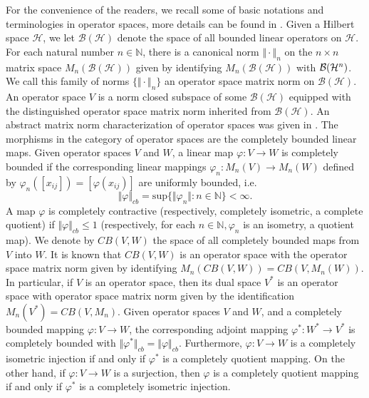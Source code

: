 \documentclass[12pt]{article}
\theoremstyle{definition}
\theoremstyle{remark}
\begin{document}
For the convenience of the readers, we recall
some of basic notations and terminologies in operator spaces, more
details can be found in \cite{ER00, Pi03}. Given a Hilbert space $\mathcal{H}$, we
let $\mathcal{B}(\mathcal{H})$ denote the space of all bounded linear operators on
$\mathcal{H}$. For each natural number $n\in\mathbb{N}$, there is a
canonical norm $\Vert\cdot\Vert_{n}$ on the $n\times n$ matrix space
$M_{n}(\mathcal{B}(\mathcal{H}))$ given by identifying $M_{n}(\mathcal{B}(\mathcal{H}))$ with ${\cal
B}({\cal H}^{n})$. We call this family of norms
$\{\Vert \cdot\Vert_{n}\}$ an operator space matrix norm on $\mathcal{B}(\mathcal{H})$. An
operator space $V$ is a norm closed subspace of some $\mathcal{B}(\mathcal{H})$
equipped with the distinguished operator space matrix norm
inherited from $\mathcal{B}(\mathcal{H})$. An abstract matrix norm characterization of
operator spaces was given in \cite{Ru89}. The morphisms in the category
of operator spaces are the completely bounded linear maps. Given
operator spaces $V$ and $W$, a linear map $\varphi:V\rightarrow W$
is completely bounded if the corresponding linear mappings
$\varphi_{n}:M_{n}(V)\rightarrow M_{n}(W)$ defined by
$\varphi_{n}([x_{ij}])=[\varphi(x_{ij})]$ are uniformly bounded,
i.e.
$$\Vert\varphi\Vert_{cb}=\mbox{sup}\{\Vert\varphi_{n}\Vert: n\in\mathbb{N}\}<\infty.$$
A map $\varphi$ is completely contractive (respectively,
completely isometric, a complete quotient) if
$\Vert\varphi\Vert_{cb}\leq 1$ (respectively, for each
$n\in\mathbb{N}, \varphi_{n}$ is an isometry, a quotient map). We
denote by $CB(V, W)$ the space of all completely bounded maps from
$V$ into $W$. It is known that $CB(V, W)$ is an operator space
with the operator space matrix norm given by identifying
$M_{n}(CB(V, W))=CB(V, M_{n}(W))$. In particular, if $V$ is an
operator space, then its dual space $V^{*}$ is an operator space
with operator space matrix norm given by the identification
$M_{n}(V^{*})=CB(V, M_{n})$. Given operator spaces $V$ and $W$,
and a completely bounded mapping $\varphi: V\rightarrow W$, the
corresponding adjoint mapping $\varphi^{*}: W^{*}\rightarrow V^{*}$ is
completely bounded with
$\Vert\varphi^{*}\Vert_{cb}=\Vert\varphi\Vert_{cb}$. Furthermore,
$\varphi: V\rightarrow W$ is a completely isometric injection if and only
if $\varphi^{*}$ is a completely quotient mapping. On the other
hand, if $\varphi: V\rightarrow W$ is a surjection, then $\varphi$ is a
completely quotient mapping if and only if $\varphi^{*}$ is a
completely isometric injection.
\end{document}
